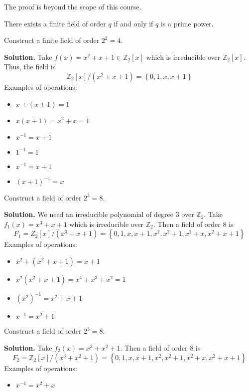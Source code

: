 The proof is beyond the scope of this course.

\begin{Theorem}{}{}
    There exists a finite field of order $ q $ if and only if
    $ q $ is a prime power.
\end{Theorem}

\begin{Example}{}{}
    Construct a finite field of order $ 2^2=4 $.

    \textbf{Solution.} Take $ f(x)=x^2+x+1\in\mathbb{Z}_2[x] $
    which is irreducible over $ \mathbb{Z}_2[x] $. Thus, the field is
    \[ \mathbb{Z}_2[x]/(x^2+x+1)=\left\{ 0,1,x,x+1\right\} \]
    Examples of operations:
    \begin{itemize}
        \item $ x+(x+1)=1 $
        \item $ x(x+1)=x^2+x=1 $
        \item $ x^{-1}=x+1 $
        \item $ 1^{-1}=1 $
        \item $ x^{-1}=x+1 $
        \item $ (x+1)^{-1}=x $
    \end{itemize}
\end{Example}

\begin{Example}{}{}
    Construct a field of order $ 2^3=8 $.

    \textbf{Solution.} We need an irreducible polynomial of degree $ 3 $
    over $ \mathbb{Z}_2 $. Take $ f_1(x)=x^3+x+1 $ which is
    irreducible over $ \mathbb{Z}_2 $. Then a field of order $ 8 $ is
    \[ F_1=Z_2[x]/(x^3+x+1)=\left\{ 0,1,x,x+1,x^2,x^2+1,x^2+x,x^2+x+1\right\} \]
    Examples of operations:
    \begin{itemize}
        \item $ x^2+(x^2+x+1)=x+1 $
        \item $ x^2(x^2+x+1)=x^4+x^3+x^2=1 $
        \item $ (x^2)^{-1}=x^2+x+1 $
        \item $ x^{-1}=x^2+1 $
    \end{itemize}
\end{Example}



\begin{Example}{}{}
    Construct a field of order $ 2^3=8 $.

    \textbf{Solution.} Take $ f_2(x)=x^3+x^2+1 $. Then a field of order $ 8 $ is
    \[ F_2=\mathbb{Z}_2[x]/(x^3+x^2+1)=\left\{ 0,1,x,x+1,x^2,x^2+1,x^2+x,x^2+x+1\right\} \]
    Examples of operations:
    \begin{itemize}
        \item $ x^{-1}=x^2+x $
    \end{itemize}
\end{Example}


